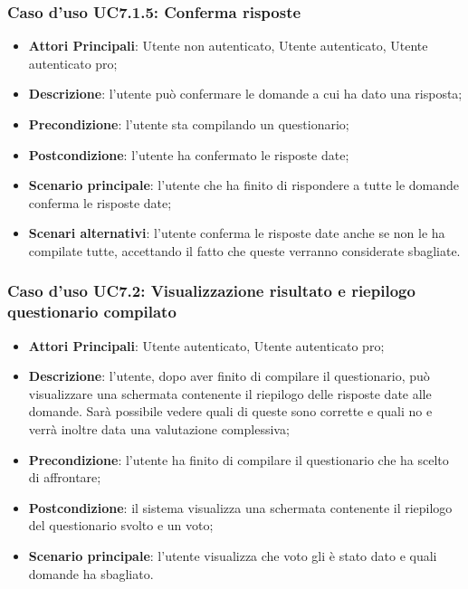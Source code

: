 \subsubsection{Caso d'uso UC7.1.5: Conferma risposte}
\label{UC7.1.5}
\begin{itemize}
\item\textbf{Attori Principali}: Utente non autenticato, Utente autenticato, Utente autenticato pro;
\item\textbf{Descrizione}: l'utente può confermare le domande a cui ha dato una risposta;
\item\textbf{Precondizione}: l'utente sta compilando un questionario;
\item\textbf{Postcondizione}: l'utente ha confermato le risposte date;
\item\textbf{Scenario principale}: l'utente che ha finito di rispondere a tutte le domande conferma le risposte date;
\item\textbf{Scenari alternativi}: l'utente conferma le risposte date anche se non le ha compilate tutte, accettando il fatto che queste verranno considerate sbagliate.
\end{itemize}

\subsubsection{Caso d'uso UC7.2: Visualizzazione risultato e riepilogo questionario compilato}
\label{UC7.2}
\begin{itemize}
\item\textbf{Attori Principali}: Utente autenticato, Utente autenticato pro;
\item\textbf{Descrizione}: l'utente, dopo aver finito di compilare il questionario, può visualizzare una schermata contenente il riepilogo delle risposte date alle domande. Sarà possibile vedere quali di queste sono corrette e quali no e verrà inoltre data una valutazione complessiva;
\item\textbf{Precondizione}: l'utente ha finito di compilare il questionario che ha scelto di affrontare;
\item\textbf{Postcondizione}: il sistema visualizza una schermata contenente il riepilogo del questionario svolto e un voto;
\item\textbf{Scenario principale}: l'utente visualizza che voto gli è stato dato e quali domande ha sbagliato.
\end{itemize}

